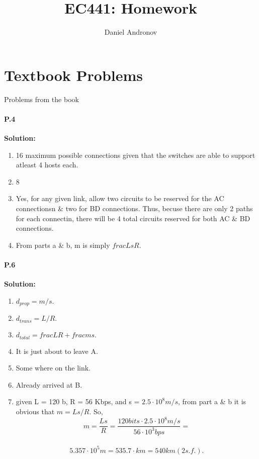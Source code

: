 \documentclass[12pt]{article}
\title{EC441: Homework \hwNum{}}
\author{Daniel Andronov}
\date{\displaydate{date}}
\begin{document}
\maketitle
\newpage

\section{Textbook Problems}
Problems from the book

\paragraph{P.4\\}
\textbf{Solution:}
\begin{enumerate}[label= \alph*)]
\item 16 maximum possible connections given that the switches are able to support atleast 4 hosts each.
\item 8
\item Yes, for any given link, allow two circuits to be reserved for the AC connectionsn \& two for BD connections. Thus, becuse there are only 2 paths for each connectin, there will be 4 total circuits reserved for both AC \& BD connections.
\item From parts a \& b, m is simply $frac{Ls}{R}$.
\end{enumerate}                          

                                                                                                                                                                                                                                   
\paragraph{P.6\\}                                                                                                                                                      
\textbf{Solution:}
\begin{enumerate}[label = \alph*)]
\item $d_{prop} = m/s.$
\item $d_{trans} = L/R.$
\item $d_{total} = frac{L}{R} + frac{m}{s}.$
\item It is just about to leave A.
\item Some where on the link.
\item Already arrived at B.
\item given L = 120 b, R = 56 Kbps, and s = $2.5\cdot10^8 m/s$, from part a \& b it is obvious that $m = Ls/R$. So,\\
$$m = \frac{Ls}{R} = \frac{120 bits\cdot2.5\cdot10^8 m/s}{56\cdot10^3 bps}= $$\\
$$5.357\cdot10^5 m = 535.7\cdot km = 540 km (2 s.f.).$$
\end{enumerate}                
\end{document}

